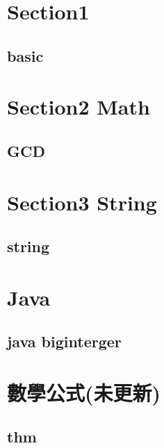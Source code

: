 \section{Section1}
    \subsection{basic}
        
        
\section{Section2 Math}
    \subsection{GCD}
            

\section{Section3 String}
    \subsection{string}
        

\section{Java}
    \subsection{java biginterger}
        


\section{數學公式(未更新)}
    \subsection{thm}
        
        
